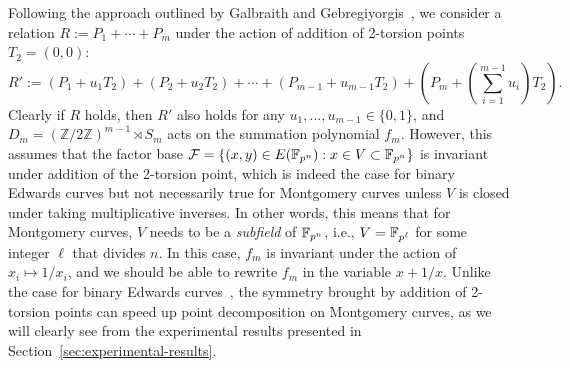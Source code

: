 Following the approach outlined by Galbraith and
Gebregiyorgis~\cite{DBLP:conf/indocrypt/GalbraithG14}, we consider a
relation $R:=P_1+\cdots+P_m$ under the action of addition of 2-torsion
points $T_2=(0,0)$:
\[ R' :=
  (P_1+u_1T_2)+(P_2+u_2T_2)+\cdots+(P_{m-1}+u_{m-1}T_2)+\left(P_m+\left(\sum_{i=1}^{m-1}u_i\right)T_2\right). \]
%
Clearly if $R$ holds, then $R'$ also holds for any
$u_1,\ldots,u_{m-1}\in\{0,1\}$, and
$D_m=(\mathbb{Z}/2\mathbb{Z})^{m-1}\rtimes S_m$ acts on the summation
polynomial $f_m$.
%
However, this assumes that the factor base
$\mathcal F=\{(x,y)\in E(\mathbb F_{p^n}):x\in V\subset\mathbb F_{p^n}\}$ is invariant
under addition of the 2-torsion point, which is indeed the case for
binary Edwards curves but not necessarily true for Montgomery curves
unless $V$ is closed under taking multiplicative inverses.
%
In other words, this means that for Montgomery curves, $V$ needs to be
a \emph{subfield} of $\mathbb F_{p^n}$, i.e., $V=\mathbb F_{p^\ell}$ for some integer
$\ell$ that divides $n$.
%
In this case, $f_m$ is invariant under the action of
$x_i\mapsto 1/x_i$, and we should be able to rewrite $f_m$ in the
variable $x+1/x$.
%
Unlike the case for binary Edwards
curves~\cite{DBLP:conf/indocrypt/GalbraithG14}, the symmetry brought
by addition of 2-torsion points can speed up point decomposition on
Montgomery curves, as we will clearly see from the experimental
results presented in Section~\ref{sec:experimental-results}.

